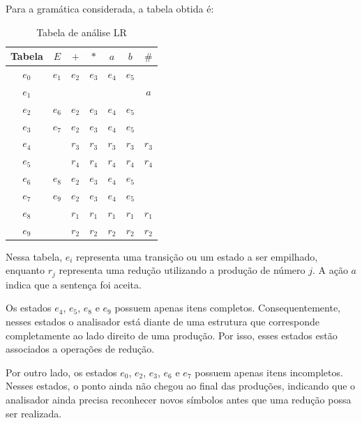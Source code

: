 \documentclass[
  brazilian,
  letterpaper,
]{book}
\theoremstyle{plain}
\theoremstyle{definition}
\theoremstyle{remark}
\begin{document}
Para a gramática considerada, a tabela obtida é:

\begin{longtable}[]{|c|c|c|c|c|c|c|}

\caption{\label{tbl-tabela-lr}Tabela de análise LR}

\tabularnewline

\toprule\noalign{}
\textbf{Tabela} & \(E\) & \(+\) & \(*\) & \(a\) & \(b\) & \(\#\) \\
\midrule\noalign{}
\endhead
\bottomrule\noalign{}
\endlastfoot
\(e_0\) & \(e_1\) & \(e_2\) & \(e_3\) & \(e_4\) & \(e_5\) & \\
\midrule
\(e_1\) & & & & & & \(a\) \\
\midrule
\(e_2\) & \(e_6\) & \(e_2\) & \(e_3\) & \(e_4\) & \(e_5\) & \\
\midrule
\(e_3\) & \(e_7\) & \(e_2\) & \(e_3\) & \(e_4\) & \(e_5\) & \\
\midrule
\(e_4\) & & \(r_3\) & \(r_3\) & \(r_3\) & \(r_3\) & \(r_3\) \\
\midrule
\(e_5\) & & \(r_4\) & \(r_4\) & \(r_4\) & \(r_4\) & \(r_4\) \\
\midrule
\(e_6\) & \(e_8\) & \(e_2\) & \(e_3\) & \(e_4\) & \(e_5\) & \\
\midrule
\(e_7\) & \(e_9\) & \(e_2\) & \(e_3\) & \(e_4\) & \(e_5\) & \\
\midrule
\(e_8\) & & \(r_1\) & \(r_1\) & \(r_1\) & \(r_1\) & \(r_1\) \\
\midrule
\(e_9\) & & \(r_2\) & \(r_2\) & \(r_2\) & \(r_2\) & \(r_2\) \\

\end{longtable}

Nessa tabela, \(e_i\) representa uma transição ou um estado a ser
empilhado, enquanto \(r_j\) representa uma redução utilizando a produção
de número \(j\). A ação \(a\) indica que a sentença foi aceita.

Os estados \(e_4\), \(e_5\), \(e_8\) e \(e_9\) possuem apenas itens
completos. Consequentemente, nesses estados o analisador está diante de
uma estrutura que corresponde completamente ao lado direito de uma
produção. Por isso, esses estados estão associados a operações de
redução.

Por outro lado, os estados \(e_0\), \(e_2\), \(e_3\), \(e_6\) e \(e_7\)
possuem apenas itens incompletos. Nesses estados, o ponto ainda não
chegou ao final das produções, indicando que o analisador ainda precisa
reconhecer novos símbolos antes que uma redução possa ser realizada.
\end{document}
